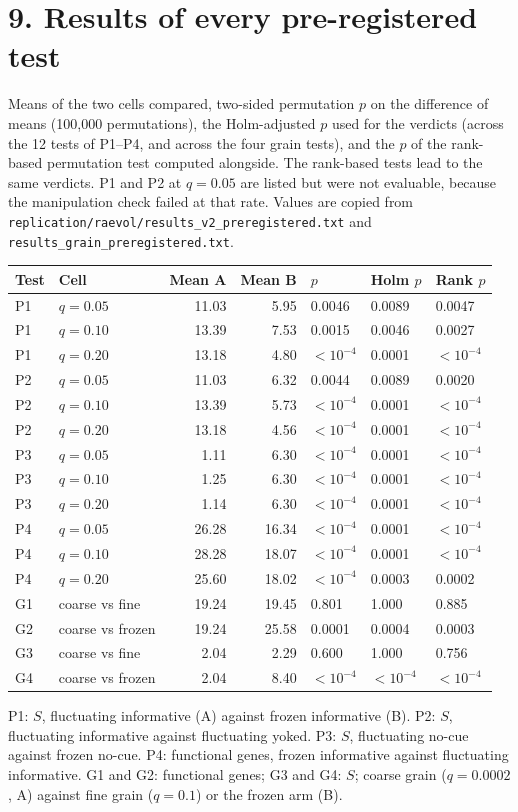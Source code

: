 \section*{9. Results of every pre-registered test}
Means of the two cells compared, two-sided permutation $p$ on the difference of
means (100{,}000 permutations), the Holm-adjusted $p$ used for the verdicts
(across the 12 tests of P1--P4, and across the four grain tests), and the $p$ of
the rank-based permutation test computed alongside. The rank-based tests lead to
the same verdicts. P1 and P2 at $q=0.05$ are listed but were not evaluable,
because the manipulation check failed at that rate. Values are copied from
\texttt{replication/raevol/results\_v2\_preregistered.txt} and
\texttt{results\_grain\_preregistered.txt}.
\begin{center}
\small
\begin{tabular}{@{}llrrlll@{}}
\toprule
Test & Cell & Mean A & Mean B & $p$ & Holm $p$ & Rank $p$\\
\midrule
P1 & $q=0.05$ & 11.03 & 5.95 & 0.0046 & 0.0089 & 0.0047\\
P1 & $q=0.10$ & 13.39 & 7.53 & 0.0015 & 0.0046 & 0.0027\\
P1 & $q=0.20$ & 13.18 & 4.80 & $<10^{-4}$ & 0.0001 & $<10^{-4}$\\
P2 & $q=0.05$ & 11.03 & 6.32 & 0.0044 & 0.0089 & 0.0020\\
P2 & $q=0.10$ & 13.39 & 5.73 & $<10^{-4}$ & 0.0001 & $<10^{-4}$\\
P2 & $q=0.20$ & 13.18 & 4.56 & $<10^{-4}$ & 0.0001 & $<10^{-4}$\\
P3 & $q=0.05$ & 1.11 & 6.30 & $<10^{-4}$ & 0.0001 & $<10^{-4}$\\
P3 & $q=0.10$ & 1.25 & 6.30 & $<10^{-4}$ & 0.0001 & $<10^{-4}$\\
P3 & $q=0.20$ & 1.14 & 6.30 & $<10^{-4}$ & 0.0001 & $<10^{-4}$\\
P4 & $q=0.05$ & 26.28 & 16.34 & $<10^{-4}$ & 0.0001 & $<10^{-4}$\\
P4 & $q=0.10$ & 28.28 & 18.07 & $<10^{-4}$ & 0.0001 & $<10^{-4}$\\
P4 & $q=0.20$ & 25.60 & 18.02 & $<10^{-4}$ & 0.0003 & 0.0002\\
G1 & coarse vs fine & 19.24 & 19.45 & 0.801 & 1.000 & 0.885\\
G2 & coarse vs frozen & 19.24 & 25.58 & 0.0001 & 0.0004 & 0.0003\\
G3 & coarse vs fine & 2.04 & 2.29 & 0.600 & 1.000 & 0.756\\
G4 & coarse vs frozen & 2.04 & 8.40 & $<10^{-4}$ & $<10^{-4}$ & $<10^{-4}$\\
\bottomrule
\end{tabular}
\end{center}
P1: $S$, fluctuating informative (A) against frozen informative (B). P2: $S$,
fluctuating informative against fluctuating yoked. P3: $S$, fluctuating no-cue
against frozen no-cue. P4: functional genes, frozen informative against
fluctuating informative. G1 and G2: functional genes; G3 and G4: $S$; coarse
grain ($q=0.0002$, A) against fine grain ($q=0.1$) or the frozen arm (B).

